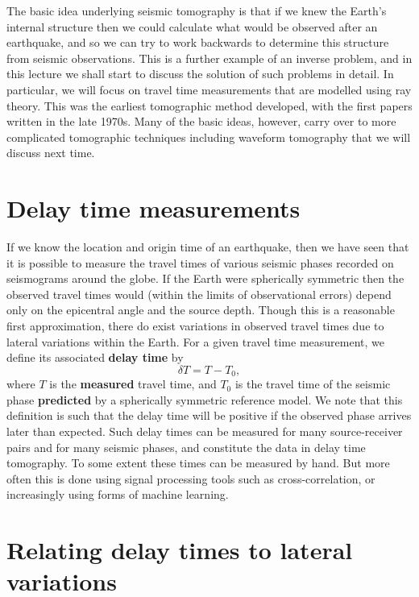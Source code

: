 The basic idea underlying seismic tomography is that if we knew the Earth's internal structure then we could calculate what
would be observed after an earthquake, and so we can try to work backwards to determine this structure from seismic observations.
This is a further example of an inverse problem, and in this lecture we shall start to discuss the solution of such problems in 
detail. In particular, we will focus on travel time measurements that are modelled using ray theory. This was the earliest 
tomographic method developed, with the first papers written in the late 1970s. Many of the basic ideas, however, carry over to 
more complicated tomographic techniques including waveform tomography that we will discuss next time.

\section*{Delay time measurements}

If we know the location and origin time of an earthquake, then we have seen that it is possible to measure the travel times of 
various seismic phases recorded on seismograms around the globe. If the Earth were spherically symmetric then the observed travel 
times would (within the limits of observational errors) depend only on the epicentral angle and the source depth. Though this is 
a reasonable first approximation, there do exist variations in observed travel times due to lateral variations within the Earth. 
For a given travel time measurement, we define its associated \textbf{delay time} by
\begin{equation}
    \delta T = T - T_{0},
    \label{eq:1}
\end{equation}
where $T$ is the \textbf{measured} travel time, and $T_{0}$ is the travel time of the seismic phase \textbf{predicted}
by a spherically symmetric reference model. We note that this definition is such that the delay time will be positive if the observed 
phase arrives later than expected. Such delay times can be measured for many source-receiver pairs and for many seismic 
phases, and constitute the data in delay time tomography. To some extent these times can be measured by hand. But more 
often this is done using signal processing tools such as cross-correlation, or increasingly using forms of machine 
learning.

\section*{Relating delay times to lateral variations}

